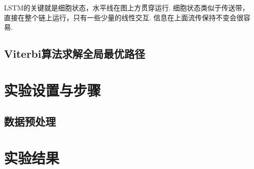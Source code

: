 \documentclass[paper=a4, fontsize=11pt]{scrartcl} %
\numberwithin{equation}{section} %
\numberwithin{figure}{section} %
\numberwithin{table}{section} %
\begin{document}
LSTM的关键就是细胞状态，水平线在图上方贯穿运行.
细胞状态类似于传送带，直接在整个链上运行，只有一些少量的线性交互.
信息在上面流传保持不变会很容易.



\subsection{Viterbi算法求解全局最优路径}





\section{实验设置与步骤}
\subsection{数据预处理}
\section{实验结果}
\end{document}
